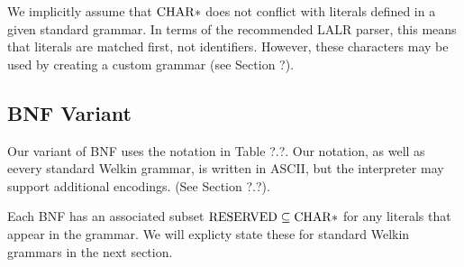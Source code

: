 
We implicitly assume that $\mathrm{CHAR}*$ does not conflict with literals defined in a given standard grammar. In terms of the recommended LALR parser, this means that literals are matched first, not identifiers. However, these characters may be used by creating a custom grammar (see Section ?).


\subsection{BNF Variant}
Our variant of BNF uses the notation in Table ?.?. Our notation, as well as eevery standard Welkin grammar, is written in ASCII, but the interpreter may support additional encodings. (See Section ?.?).


Each BNF has an associated subset $\mathrm{RESERVED} \subseteq \mathrm{CHAR}*$ for any literals that appear in the grammar. We will explicty state these for standard Welkin grammars in the next section.


